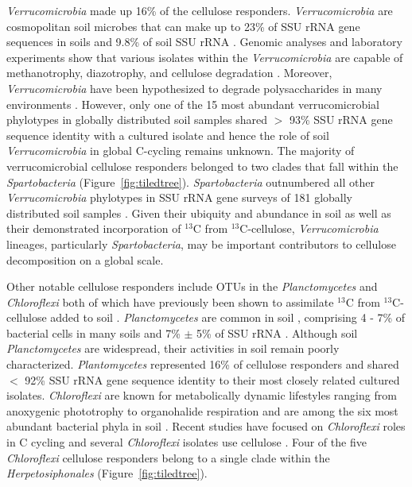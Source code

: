 \textit{Verrucomicrobia} made up 16\% of the cellulose responders.
\textit{Verrucomicrobia} are cosmopolitan soil microbes \citep{Bergmann_2011}
that can make up to 23\% of SSU rRNA gene sequences in soils
\citep{Bergmann_2011} and 9.8\% of soil SSU rRNA \citep{Buckley_2001}. Genomic
analyses and laboratory experiments show that various isolates
within the \textit{Verrucomicrobia} are capable of methanotrophy, diazotrophy,
and cellulose degradation \citep{Wertz_2011,Otsuka_2012}. Moreover,
\textit{Verrucomicrobia} have been hypothesized to degrade polysaccharides in
many environments \citep{Fierer_2013,10543821,Herlemann_2013}. However, only
one of the 15 most abundant verrucomicrobial phylotypes in globally distributed
soil samples shared $>$ 93\% SSU rRNA gene sequence identity with a cultured
isolate \citep{Bergmann_2011} and hence the role of soil
\textit{Verrucomicrobia} in global C-cycling remains unknown. The majority of
verrucomicrobial cellulose responders belonged to two clades that fall within
the \textit{Spartobacteria} (Figure~\ref{fig:tiledtree}).
\textit{Spartobacteria} outnumbered all other \textit{Verrucomicrobia}
phylotypes in SSU rRNA gene surveys of
181 globally distributed soil samples \citep{Bergmann_2011}. Given their ubiquity and abundance
in soil as well as their demonstrated incorporation of $^{13}$C from
$^{13}$C-cellulose, \textit{Verrucomicrobia} lineages, particularly
\textit{Spartobacteria}, may be important contributors to cellulose
decomposition on a global scale. 

Other notable cellulose responders include OTUs in the \textit{Planctomycetes}
and \textit{Chloroflexi} both of which have previously been shown to
assimilate $^{13}$C from $^{13}$C-cellulose added to soil
\citep{Schellenberger_2010}. \textit{Planctomycetes} are common in soil
\citep{Janssen2006}, comprising 4 - 7\% of bacterial cells in many soils
\citep{Zarda_1997,Chatzinotas_1998} and 7\% $\pm$ 5\% of SSU rRNA
\citep{buckley_2003}. Although soil \textit{Planctomycetes} are widespread,
their activities in soil remain poorly characterized. \textit{Plantomycetes}
represented 16\% of cellulose responders and shared $<$ 92\% SSU rRNA gene
sequence identity to their most closely related cultured isolates.
\textit{Chloroflexi} are known for metabolically dynamic lifestyles ranging
from anoxygenic phototrophy to organohalide respiration \citep{Hug_2013} and
are among the six most abundant bacterial phyla in soil \citep{Janssen2006}.
Recent studies have focused on \textit{Chloroflexi} roles in C cycling
\citep{Hug_2013,Goldfarb_2011,Cole_2013} and several \textit{Chloroflexi}
isolates use cellulose \citep{Hug_2013,Goldfarb_2011,Cole_2013}. Four
of the five \textit{Chloroflexi} cellulose responders belong to a single clade
within the \textit{Herpetosiphonales} (Figure~\ref{fig:tiledtree}). 

